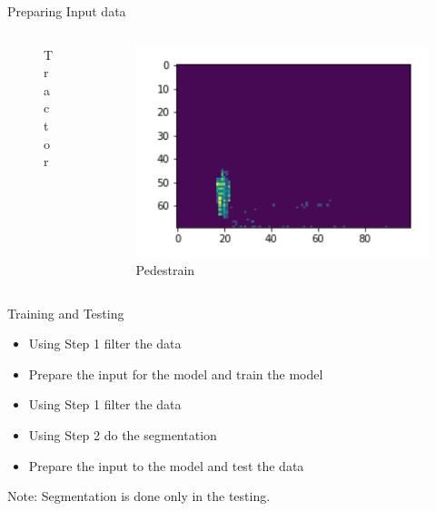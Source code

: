 \documentclass[9pt]{beamer}
\begin{document}
\begin{frame}[fragile]{Preparing Input data}
\begin{columns}
\begin{column}{0.33\textwidth}
\begin{figure}
				\caption{Tractor}
			\end{figure}
		\end{column}
		\begin{column}{0.33\textwidth}
			\begin{figure}
				\centering
				\includegraphics[width=\textwidth]{images/pedestrian.png}		
				\caption{Pedestrain}
			\end{figure}
		\end{column}
	\end{columns}

\end{frame}


\begin{frame}[fragile]{Training and Testing}
\begin{itemize}
	\item Using Step 1 filter the data
	\item Prepare the input for the model and train the model
\end{itemize}


\begin{itemize}
	\item Using Step 1 filter the data
	\item Using Step 2 do the segmentation
	\item Prepare the input to the model and test the data
\end{itemize}

Note: Segmentation is done only in the testing.

\end{frame}
\end{document}
